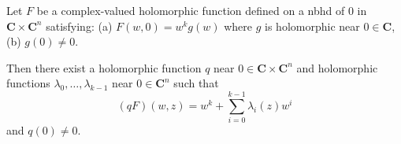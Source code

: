 Let $F$ be a complex-valued holomorphic function defined on a nbhd of $0$ in $\mathbf{C} \times \mathbf{C}^n$ satisfying:
(a) $F(w, 0) = w^k g(w)$ where $g$ is holomorphic near $0 \in \mathbf{C}$,
(b) $g(0) \neq 0$.

Then there exist a holomorphic function $q$ near $0 \in \mathbf{C} \times \mathbf{C}^n$ and holomorphic functions $\lambda_0, \ldots, \lambda_{k-1}$ near $0 \in \mathbf{C}^n$ such that
$$(qF)(w, z) = w^k + \sum_{i=0}^{k-1} \lambda_i(z)w^i$$
and $q(0) \neq 0$.
